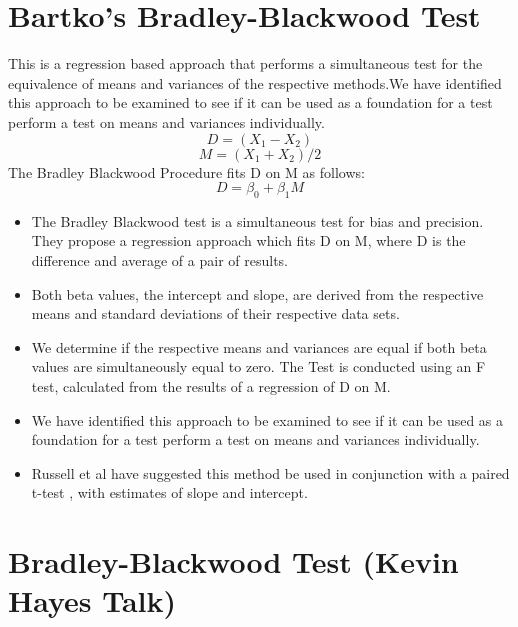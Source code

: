 \documentclass[12pt, a4paper]{report}
\theoremstyle{plain}
\theoremstyle{definition}
\theoremstyle{remark}
\begin{document}
	\section{Bartko's Bradley-Blackwood Test}
	This is a regression based
	approach that performs a simultaneous test for the equivalence of
	means and variances of the respective methods.We have identified
	this approach  to be examined to see if it can be used as a
	foundation for a test perform a test on
	means and variances individually.
	\begin{equation}
	D = (X_{1}-X_{2})
	\end{equation}
	\begin{equation}
	M = (X_{1} + X_{2}) /2
	\end{equation}
	The Bradley Blackwood Procedure fits D on M as follows:\\
	\begin{equation}
	D = \beta_{0} + \beta_{1}M
	\end{equation}
	\begin{itemize}
		\item The Bradley Blackwood test is a simultaneous test for bias and
		precision. They propose a regression approach which fits D on M,
		where D is the difference and average of a pair of results.
		\item Both beta values, the intercept and slope, are derived from the respective means and
		standard deviations of their respective data sets.
		\item We determine if the respective means and variances are equal if
		both beta values are simultaneously equal to zero. The Test is
		conducted using an F test, calculated from the results of a
		regression of D on M.
		\item We have identified this approach  to be examined to see if it can
		be used as a foundation for a test perform a test on means and
		variances individually.
		\item Russell et al have suggested this method be used in conjunction
		with a paired t-test , with estimates of slope and intercept.
	\end{itemize}
	
	


	\section{Bradley-Blackwood Test (Kevin Hayes Talk)}
	
\end{document}

